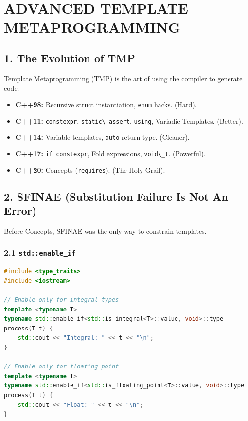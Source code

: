 \hypertarget{advanced-template-metaprogramming}{%
\chapter{ADVANCED TEMPLATE
METAPROGRAMMING}\label{advanced-template-metaprogramming}}

\hypertarget{the-evolution-of-tmp}{%
\section{1. The Evolution of TMP}\label{the-evolution-of-tmp}}

Template Metaprogramming (TMP) is the art of using the compiler to
generate code.

\begin{itemize}
\tightlist
\item
  \textbf{C++98:} Recursive struct instantiation,
  \passthrough{\lstinline!enum!} hacks. (Hard).
\item
  \textbf{C++11:} \passthrough{\lstinline!constexpr!},
  \passthrough{\lstinline!static\_assert!},
  \passthrough{\lstinline!using!}, Variadic Templates. (Better).
\item
  \textbf{C++14:} Variable templates, \passthrough{\lstinline!auto!}
  return type. (Cleaner).
\item
  \textbf{C++17:} \passthrough{\lstinline!if constexpr!}, Fold
  expressions, \passthrough{\lstinline!void\_t!}. (Powerful).
\item
  \textbf{C++20:} Concepts (\passthrough{\lstinline!requires!}). (The
  Holy Grail).
\end{itemize}

\hypertarget{sfinae-substitution-failure-is-not-an-error}{%
\section{2. SFINAE (Substitution Failure Is Not An
Error)}\label{sfinae-substitution-failure-is-not-an-error}}

Before Concepts, SFINAE was the only way to constrain templates.

\hypertarget{stdenable_if}{%
\subsection{\texorpdfstring{2.1
\texttt{std::enable\_if}}{2.1 std::enable\_if}}\label{stdenable_if}}

\begin{lstlisting}[language={C++}]
#include <type_traits>
#include <iostream>

// Enable only for integral types
template <typename T>
typename std::enable_if<std::is_integral<T>::value, void>::type
process(T t) {
    std::cout << "Integral: " << t << "\n";
}

// Enable only for floating point
template <typename T>
typename std::enable_if<std::is_floating_point<T>::value, void>::type
process(T t) {
    std::cout << "Float: " << t << "\n";
}
\end{lstlisting}


